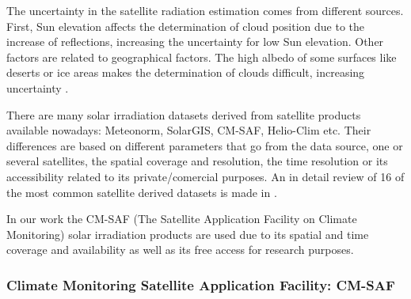 The uncertainty in the satellite radiation estimation comes from different sources. First, Sun elevation affects the determination of cloud position due to the increase of reflections, increasing  the uncertainty for low Sun elevation. Other factors are related to geographical factors. The high albedo of some surfaces like deserts or ice areas makes the determination of clouds difficult, increasing uncertainty \cite*{Cebecauer2011}.

There are many solar irradiation datasets derived from satellite products available nowadays: Meteonorm, SolarGIS, CM-SAF, Helio-Clim etc. Their differences are based on different parameters that go from the data source, one or several satellites, the spatial coverage and resolution, the time resolution or its accessibility related to its private/comercial purposes. An in detail review of 16 of the most common satellite derived datasets is made in \cite*{Vernay2014}.

 

In our work the CM-SAF (The Satellite Application Facility on Climate Monitoring) solar irradiation products are used due to its spatial and time coverage and availability as well as its free access for research purposes.

\subsubsection{Climate Monitoring Satellite Application Facility: CM-SAF}
 
